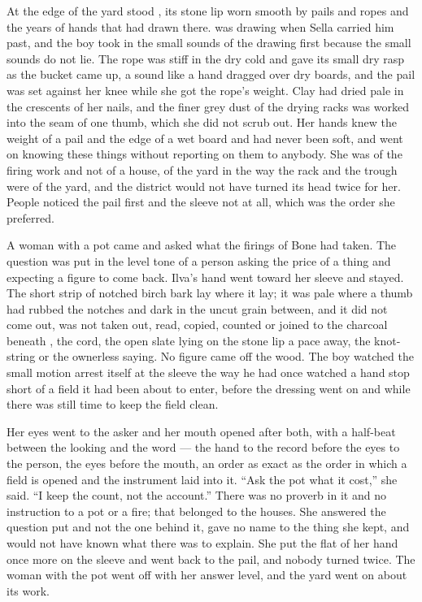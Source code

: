 At the edge of the yard stood , its stone lip worn smooth by pails and ropes and the years of hands that had drawn there.  was drawing when Sella carried him past, and the boy took in the small sounds of the drawing first because the small sounds do not lie. The rope was stiff in the dry cold and gave its small dry rasp as the bucket came up, a sound like a hand dragged over dry boards, and the pail was set against her knee while she got the rope's weight. Clay had dried pale in the crescents of her nails, and the finer grey dust of the drying racks was worked into the seam of one thumb, which she did not scrub out. Her hands knew the weight of a pail and the edge of a wet board and had never been soft, and went on knowing these things without reporting on them to anybody. She was of the firing work and not of a house, of the yard in the way the rack and the trough were of the yard, and the district would not have turned its head twice for her. People noticed the pail first and the sleeve not at all, which was the order she preferred.

A woman with a pot came and asked what the firings of Bone had taken. The question was put in the level tone of a person asking the price of a thing and expecting a figure to come back. Ilva's hand went toward her sleeve and stayed. The short strip of notched birch bark lay where it lay; it was pale where a thumb had rubbed the notches and dark in the uncut grain between, and it did not come out, was not taken out, read, copied, counted or joined to the charcoal beneath , the cord, the open slate lying on the stone lip a pace away, the knot-string or the ownerless saying. No figure came off the wood. The boy watched the small motion arrest itself at the sleeve the way he had once watched a hand stop short of a field it had been about to enter, before the dressing went on and while there was still time to keep the field clean.

Her eyes went to the asker and her mouth opened after both, with a half-beat between the looking and the word --- the hand to the record before the eyes to the person, the eyes before the mouth, an order as exact as the order in which a field is opened and the instrument laid into it. “Ask the pot what it cost,” she said. “I keep the count, not the account.” There was no proverb in it and no instruction to a pot or a fire; that belonged to the houses. She answered the question put and not the one behind it, gave no name to the thing she kept, and would not have known what there was to explain. She put the flat of her hand once more on the sleeve and went back to the pail, and nobody turned twice. The woman with the pot went off with her answer level, and the yard went on about its work.

